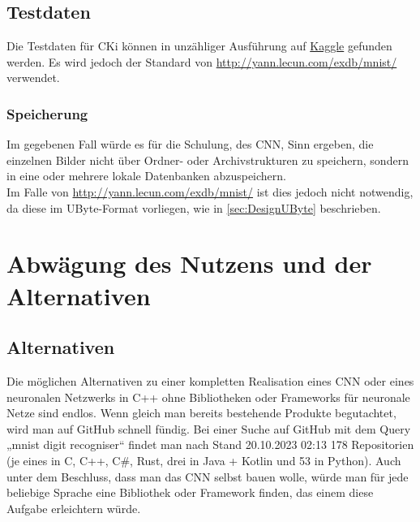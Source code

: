 \subsection{Testdaten}
\label{sec:AnalyseTestdaten}
Die Testdaten für CKi können in unzähliger Ausführung auf \href{https://www.kaggle.com/}{Kaggle} gefunden werden. Es wird jedoch der Standard von \url{http://yann.lecun.com/exdb/mnist/} verwendet.

\subsubsection{Speicherung}
\label{sec:AnalyseSpeicherung}
Im gegebenen Fall würde es für die Schulung, des CNN, Sinn ergeben, die einzelnen Bilder nicht über Ordner- oder Archivstrukturen zu speichern, sondern in eine oder mehrere lokale Datenbanken abzuspeichern.
\\
Im Falle von \url{http://yann.lecun.com/exdb/mnist/} ist dies jedoch nicht notwendig, da diese im UByte-Format vorliegen, wie in \ref{sec:DesignUByte} beschrieben.

\section{Abwägung des Nutzens und der Alternativen}
\label{sec:AnalyseNutzwertanalyseDerLösungsvarianten}
\subsection{Alternativen}
\label{sec:AnalyseAlternativen}
Die möglichen Alternativen zu einer kompletten Realisation eines CNN oder eines neuronalen Netzwerks in C++ ohne Bibliotheken oder Frameworks für neuronale Netze sind endlos. 
Wenn gleich man bereits bestehende Produkte begutachtet, wird man auf GitHub schnell fündig. Bei einer Suche auf GitHub mit dem Query „mnist digit recogniser“ findet man nach Stand 20.10.2023 02:13 178 Repositorien (je eines in C, C++, C\#, Rust, drei in Java + Kotlin und 53 in Python).
Auch unter dem Beschluss, dass man das CNN selbst bauen wolle, würde man für jede beliebige Sprache eine Bibliothek oder Framework finden, das einem diese Aufgabe erleichtern würde.

